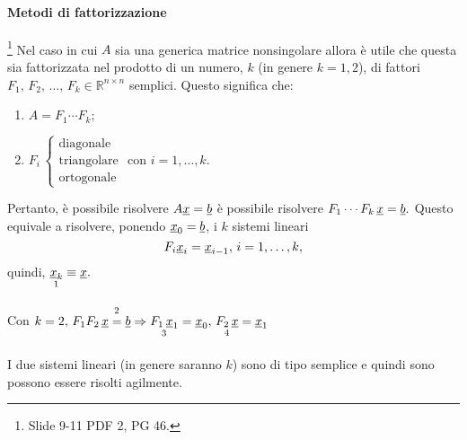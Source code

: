\paragraph{Metodi di fattorizzazione}\footnote{Slide 9-11 PDF 2, PG 46.} Nel caso in cui $A$ sia una generica matrice nonsingolare allora è utile che questa sia fattorizzata nel prodotto di un numero, $k$ (in genere $k=1,2$), di fattori $F_1,\, F_2,\,\hdots,\, F_k\in\mathbb R^{n\times n}$ semplici. Questo significa che:
\begin{enumerate}
    \item $A=F_1\cdots F_k;$
    \item $F_i\,\begin{cases}
        \text{diagonale}\\
        \text{triangolare}\\
        \text{ortogonale}
    \end{cases}$ con $i=1,\hdots, k.$
\end{enumerate}

Pertanto, è possibile risolvere $A\uline x=\uline b$  è possibile risolvere $F_1 \cdots F_k \, \uline x=\uline b.$ Questo equivale a risolvere, ponendo $\uline x_0=\uline b$, i $k$ sistemi lineari
\begin{equation*}
 F_i \uline x_i = \uline x_{i-1},\, i=1,\hdots, k,
\end{equation*}
quindi, $\underset{\footnotemark}{\uline x_k}\equiv \uline x.$ 

\begin{example}
    Con $k=2,\, F_1 F_2 \, \uline x\overset{\footnotemark}{=}\uline b\Rightarrow\underset{\footnotemark}{F_1\, \uline x_1} = \uline x_0,\, \underset{\footnotemark}{F_2\, \uline x} = \uline x_1$
\end{example}

\addtocounter{footnote}{-2}



I due sistemi lineari (in genere saranno $k$) sono di tipo semplice e quindi sono possono essere risolti agilmente.

